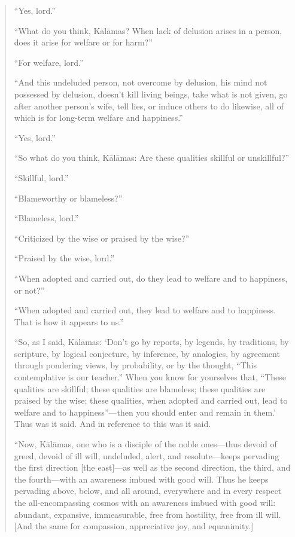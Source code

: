 \begin{quotation}
“Yes, lord.”

“What do you think, Kālāmas? When lack of delusion arises in a person,
does it arise for welfare or for harm?”

“For welfare, lord.”

“And this undeluded person, not overcome by delusion, his mind not
possessed by delusion, doesn’t kill living beings, take what is not
given, go after another person’s wife, tell lies, or induce others to do
likewise, all of which is for long-term welfare and happiness.”

“Yes, lord.”

“So what do you think, Kālāmas: Are these qualities skillful or
unskillful?”

“Skillful, lord.”

“Blameworthy or blameless?”

“Blameless, lord.”

“Criticized by the wise or praised by the wise?”

“Praised by the wise, lord.”

“When adopted and carried out, do they lead to welfare and to happiness,
or not?”

“When adopted and carried out, they lead to welfare and to happiness.
That is how it appears to us.”

“So, as I said, Kālāmas: ‘Don’t go by reports, by legends, by
traditions, by scripture, by logical conjecture, by inference, by
analogies, by agreement through pondering views, by probability, or by
the thought, “This contemplative is our teacher.” When you know for
yourselves that, “These qualities are skillful; these qualities are
blameless; these qualities are praised by the wise; these qualities,
when adopted and carried out, lead to welfare and to happiness”—then you
should enter and remain in them.’ Thus was it said. And in reference to
this was it said.

“Now, Kālāmas, one who is a disciple of the noble ones—thus devoid of
greed, devoid of ill will, undeluded, alert, and resolute—keeps
pervading the first direction {[}the east{]}—as well as the second
direction, the third, and the fourth—with an awareness imbued with good
will. Thus he keeps pervading above, below, and all around, everywhere
and in every respect the all-encompassing cosmos with an awareness
imbued with good will: abundant, expansive, immeasurable, free from
hostility, free from ill will. {[}And the same for compassion,
appreciative joy, and equanimity.{]}
\end{quotation}

